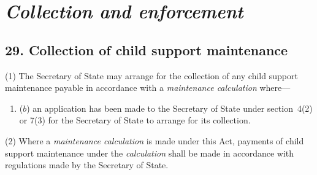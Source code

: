 \documentclass[12pt,a4paper]{article}
\begin{document}
\section{\itshape Collection and enforcement}

\subsection{29. Collection of child support maintenance}

(1) The 
Secretary of State  %
may arrange for the collection of any child support maintenance payable in accordance with a 
\emph{maintenance calculation}  %
where—
\begin{enumerate}\item[]

($b$) an application has been made to the 
Secretary of State  %
under section~4(2)  or 7(3)  for 
the Secretary of State  %
to arrange for its collection.
\end{enumerate}

(2) Where a 
\emph{maintenance calculation}  %
is made under this Act, payments of child support maintenance under the 
\emph{calculation}  %
shall be made in accordance with regulations made by the Secretary of State.
\end{document}
